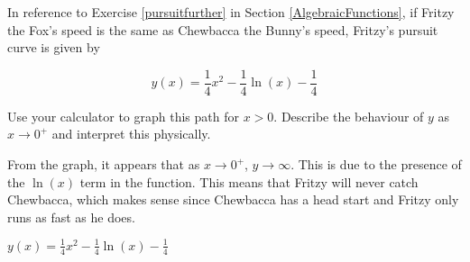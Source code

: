 {\label{pursuitlog} In reference to Exercise \ref{pursuitfurther} in Section \ref{AlgebraicFunctions}, if Fritzy the Fox's speed is the same as Chewbacca the Bunny's speed, Fritzy's pursuit curve is given by

\[y(x) = \frac{1}{4} x^2-\frac{1}{4} \ln(x)-\frac{1}{4}\]

Use your calculator to graph this path for $x > 0$.  Describe the behaviour of $y$ as $x \rightarrow 0^{+}$ and interpret this physically.}
{ From the graph, it appears that as $x \rightarrow 0^{+}$, $y \rightarrow \infty$.  This is due to the presence of the $\ln(x)$ term in the function.  This means that Fritzy will never catch Chewbacca, which makes sense since Chewbacca has a head start and Fritzy only runs as fast as he does.

\begin{center}


\smallskip

$y(x) = \frac{1}{4} x^2-\frac{1}{4} \ln(x)-\frac{1}{4}$

\end{center}}